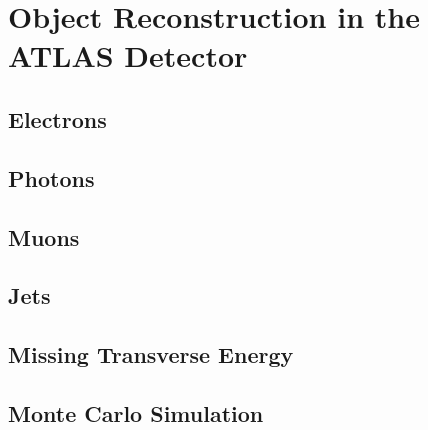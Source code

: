 \chapter{Object Reconstruction in the ATLAS Detector} %

\label{ch:reconstruction} 


\section{Electrons}
\section{Photons}
\section{Muons}
\section{Jets}
\section{Missing Transverse Energy}

\section{Monte Carlo Simulation}


